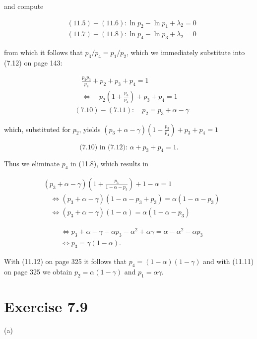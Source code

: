 \documentclass[10pt]{book}
\begin{document}
and compute

\begin{align*}
& (11.5)-(11.6): \ln p_{2}-\ln p_{1}+\lambda_{2}=0  \tag{11.9}\\
& (11.7)-(11.8): \ln p_{4}-\ln p_{3}+\lambda_{2}=0 \tag{11.10}
\end{align*}

from which it follows that $p_{3} / p_{4}=p_{1} / p_{2}$, which we immediately substitute into (7.12) on page 143:

\begin{align*}
& \quad \frac{p_{2} p_{3}}{p_{4}}+p_{2}+p_{3}+p_{4}=1 \\
& \quad \Leftrightarrow \quad p_{2}\left(1+\frac{p_{3}}{p_{4}}\right)+p_{3}+p_{4}=1  \tag{11.11}\\
& (7.10)-(7.11): \quad p_{2}=p_{3}+\alpha-\gamma
\end{align*}

which, substituted for $p_{2}$, yields $\left(p_{3}+\alpha-\gamma\right)\left(1+\frac{p_{3}}{p_{4}}\right)+p_{3}+p_{4}=1$

\begin{equation*}
\text { (7.10) in (7.12): } \alpha+p_{3}+p_{4}=1 \text {. } \tag{11.12}
\end{equation*}

Thus we eliminate $p_{4}$ in (11.8), which results in

\begin{align*}
& \left(p_{3}+\alpha-\gamma\right)\left(1+\frac{p_{3}}{1-\alpha-p_{3}}\right)+1-\alpha=1  \tag{11.13}\\
& \quad \Leftrightarrow\left(p_{3}+\alpha-\gamma\right)\left(1-\alpha-p_{3}+p_{3}\right)=\alpha\left(1-\alpha-p_{3}\right)  \tag{11.14}\\
& \quad \Leftrightarrow\left(p_{3}+\alpha-\gamma\right)(1-\alpha)=\alpha\left(1-\alpha-p_{3}\right) \tag{11.15}
\end{align*}

\begin{align*}
& \Leftrightarrow p_{3}+\alpha-\gamma-\alpha p_{3}-\alpha^{2}+\alpha \gamma=\alpha-\alpha^{2}-\alpha p_{3}  \tag{11.16}\\
& \Leftrightarrow p_{3}=\gamma(1-\alpha) . \tag{11.17}
\end{align*}

With (11.12) on page 325 it follows that $p_{4}=(1-\alpha)(1-\gamma)$ and with (11.11) on page 325 we obtain $p_{2}=\alpha(1-\gamma)$ and $p_{1}=\alpha \gamma$.

\section{Exercise 7.9}
(a)
\end{document}
